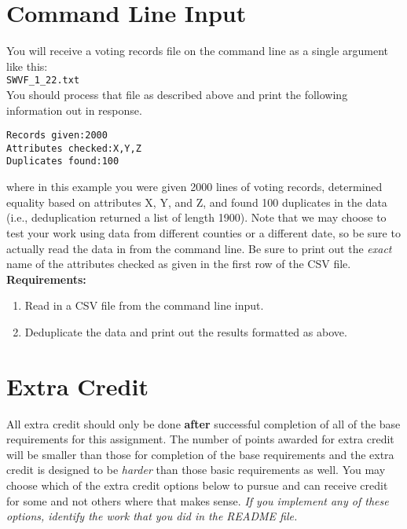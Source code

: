 \documentclass[12pt]{article}
\begin{document}
\section{Command Line Input}

You will receive a voting records file on the command line as a single argument like this:\\
\verb+SWVF_1_22.txt+\\
You should process that file as described above and print the following information out in response.

\begin{verbatim}
Records given:2000
Attributes checked:X,Y,Z
Duplicates found:100
\end{verbatim}

\noindent where in this example you were given 2000 lines of voting records, determined equality based on attributes X, Y, and Z, and found 100 duplicates in the data (i.e., deduplication returned a list of length 1900).  Note that we may choose to test your work using data from different counties or a different date, so be sure to actually read the data in from the command line.  Be sure to print out the \emph{exact} name of the attributes checked as given in the first row of the CSV file.\\

\textbf{Requirements:}
\begin{enumerate}
\item Read in a CSV file from the command line input.
\item Deduplicate the data and print out the results formatted as above.
\end{enumerate}

\section{Extra Credit}

All extra credit should only be done \textbf{after} successful completion of all of the base requirements for this assignment.  The number of points awarded for extra credit will be smaller than those for completion of the base requirements and the extra credit is designed to be \emph{harder} than those basic requirements as well.  You may choose which of the extra credit options below to pursue and can receive credit for some and not others where that makes sense.  \emph{If you implement any of these options, identify the work that you did in the README file.}
\end{document}
